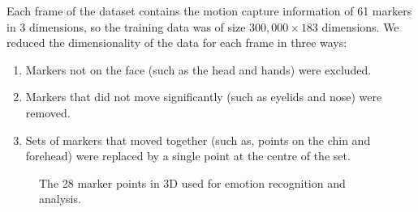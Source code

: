 \documentclass[10pt,journal,cspaper,compsoc]{IEEEtran}
\begin{document}
Each frame of the dataset contains the motion capture information of 61 markers in 3 dimensions, so the training data was of size $300,000 \times 183$ dimensions. We reduced the dimensionality of the data for each frame in three ways:

\begin{enumerate}
\item Markers not on the face (such as the head and hands) were excluded.
\item Markers that did not move significantly (such as eyelids and nose) were removed. 
\item Sets of markers that moved together (such as, points on the chin and forehead) were replaced by a single point at the centre of the set.
\end{enumerate}

\begin{figure}[ht!]
\begin{center}
\caption{The 28 marker points in 3D used for emotion recognition and analysis.}
\label{fig_markers_3D}
\end{center}
\end{figure}
\end{document}
